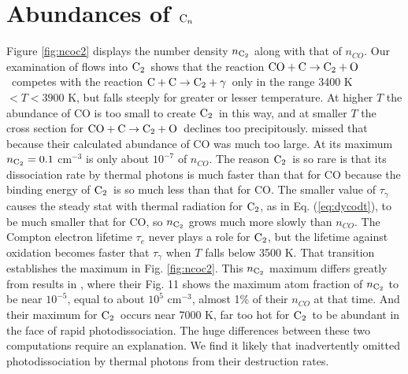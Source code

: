 \documentclass[manuscript]{aastex}
\newcommand{\ctwo}{{\rm C}_2}
\newcommand{\cenn}{{\rm C}_n}
\newcommand{\twoctoctwo}{${\rm C} + {\rm C} \to \ctwo + \gamma$}
\newcommand{\coctoctwo}{${\rm CO} + {\rm C} \to \ctwo + {\rm O}$}
\begin{document}
\section{Abundances of $\cenn$}

Figure \ref{fig:ncoc2} displays the number density $n_{\ctwo}$ along with
that of $n_{CO}$.
Our examination of flows into $\ctwo$\ shows that the reaction
\coctoctwo\ competes with the reaction \twoctoctwo\ only in the
range 3400 K $< T < 3900$ K, but falls steeply for greater or lesser
temperature.  At higher $T$ the abundance of CO is too small to create
$\ctwo$\ in this way, and at smaller $T$ the cross section for \coctoctwo\
declines too precipitously.  \citet{2009ApJ...703..642C} missed that
because their calculated abundance of CO was much too large.
At its maximum $n_{\ctwo} =0.1$ cm$^{-3}$ is only about
$10^{-7}$ of $n_{CO}$. The reason $\ctwo$\ is so rare is that its dissociation
rate by thermal photons is much faster than that for CO because the binding
energy of $\ctwo$\ is
so much less than that for CO.
The smaller value of $\tau_\gamma$ causes the steady stat with thermal
radiation for $\ctwo$, as in Eq. (\ref{eq:dycodt}), to be much smaller that for
CO, so $n_{\ctwo}$ grows much more slowly than $n_{CO}$.  The Compton
electron lifetime $\tau_e$ never plays a role for $\ctwo$, but the
lifetime against oxidation becomes faster that $\tau_\gamma$ when $T$
falls below 3500 K.  That transition establishes the maximum in
Fig. \ref{fig:ncoc2}.
This $n_{\ctwo}$
maximum differs greatly
from results in \citet{2009ApJ...703..642C}, where their Fig. 11 shows the
maximum atom fraction of $n_{\ctwo}$ to be near $10^{-5}$,
equal to about $10^5$ cm$^{-3}$, almost 1\% of their $n_{CO}$ at that time.
And their maximum for $\ctwo$\ occurs near 7000 K, far too hot for $\ctwo$\ to
be abundant in the face of rapid photodissociation. The huge differences between
these two computations require an explanation. We find it likely that
\cite{2009ApJ...703..642C} inadvertently omitted photodissociation by thermal
photons from their destruction rates.  
\end{document}
